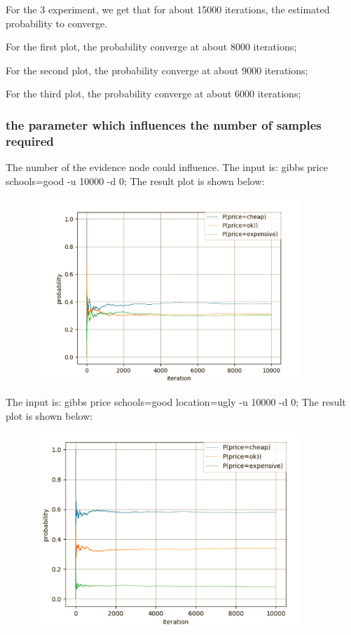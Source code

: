 \documentclass[11pt, a4paper]{article}
\begin{document}
For the 3 experiment, we get that for about 15000 iterations, the estimated probability to converge.

For the first plot, the probability converge at about 8000 iterations;

For the second plot, the probability converge at about 9000 iterations;

For the third plot, the probability converge at about 6000 iterations;

\subsubsection{the parameter which influences the number of samples required}

The number of the evidence node could influence.
The input is: gibbs price schools=good -u 10000 -d 0; The result plot is shown below: 

\begin{figure}[htbp]
	
	\centering 
	\includegraphics[width=10cm]{gs_4}
	
	\label{fig:gb4}
	
\end{figure}

The input is: gibbs price schools=good location=ugly -u 10000 -d 0; The result plot is shown below: 

\begin{figure}[htbp]
	
	\centering 
	\includegraphics[width=10cm]{gs_5}
	
	\label{fig:gb5}
	
\end{figure}
\end{document}
